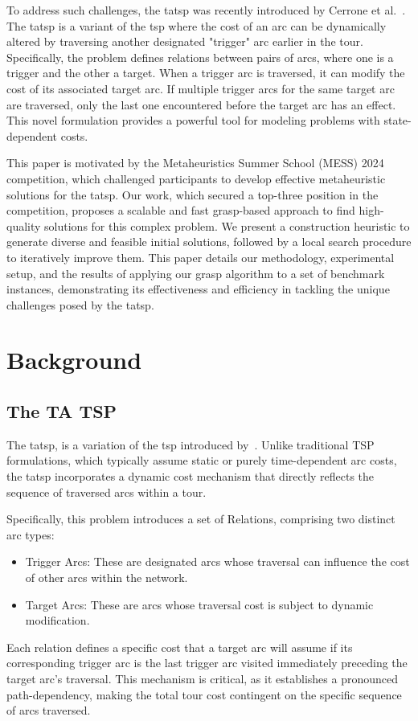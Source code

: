 \documentclass[twocolumn, switch]{article} %
\begin{document}
To address such challenges, the \gls{tatsp} was recently introduced by Cerrone et al.~\cite{Cerrone}. 
The \gls{tatsp} is a variant of the \gls{tsp} where the cost of an arc can be dynamically altered by traversing another designated "trigger" arc earlier in the tour. 
Specifically, the problem defines relations between pairs of arcs, where one is a trigger and the other a target. 
When a trigger arc is traversed, it can modify the cost of its associated target arc. 
If multiple trigger arcs for the same target arc are traversed, only the last one encountered before the target arc has an effect. 
This novel formulation provides a powerful tool for modeling problems with state-dependent costs. 

This paper is motivated by the Metaheuristics Summer School (MESS) 2024 competition, which challenged participants to develop effective metaheuristic solutions for the \gls{tatsp}. 
Our work, which secured a top-three position in the competition, proposes a scalable and fast \gls{grasp}-based approach to find high-quality solutions for this complex problem. 
We present a construction heuristic to generate diverse and feasible initial solutions, followed by a local search procedure to iteratively improve them. 
This paper details our methodology, experimental setup, and the results of applying our \gls{grasp} algorithm to a set of benchmark instances, demonstrating its effectiveness and efficiency in tackling the unique challenges posed by the \gls{tatsp}. 

\section{Background}
\label{sec:background}

\subsection{The TA TSP}

The \gls{tatsp}, is a variation of the \gls{tsp} introduced by~\cite{Cerrone}. 
Unlike traditional TSP formulations, which typically assume static or purely time-dependent arc costs, 
the \gls{tatsp} incorporates a dynamic cost mechanism that directly reflects the sequence of traversed arcs within a tour.

Specifically, this problem introduces a set of Relations, comprising two distinct arc types:
\begin{itemize}
\item Trigger Arcs: These are designated arcs whose traversal can influence the cost of other arcs within the network.
\item Target Arcs: These are arcs whose traversal cost is subject to dynamic modification.
\end{itemize}
Each relation defines a specific cost that a target arc will assume if its corresponding trigger arc is the last trigger 
arc visited immediately preceding the target arc's traversal. This mechanism is critical, as it establishes a pronounced 
path-dependency, making the total tour cost contingent on the specific sequence of arcs traversed.
\end{document}

